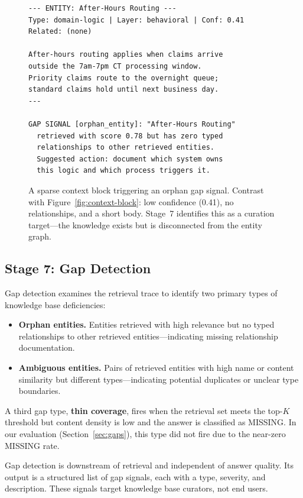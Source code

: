 \documentclass[11pt,a4paper]{article}
\begin{document}
\begin{figure}[t]
\begin{lstlisting}
--- ENTITY: After-Hours Routing ---
Type: domain-logic | Layer: behavioral | Conf: 0.41
Related: (none)

After-hours routing applies when claims arrive
outside the 7am-7pm CT processing window.
Priority claims route to the overnight queue;
standard claims hold until next business day.
---

GAP SIGNAL [orphan_entity]: "After-Hours Routing"
  retrieved with score 0.78 but has zero typed
  relationships to other retrieved entities.
  Suggested action: document which system owns
  this logic and which process triggers it.
\end{lstlisting}
\caption{A sparse context block triggering an orphan gap signal. Contrast with Figure~\ref{fig:context-block}: low confidence (0.41), no relationships, and a short body. Stage~7 identifies this as a curation target---the knowledge exists but is disconnected from the entity graph.}
\label{fig:gap-example}
\end{figure}

\subsection{Stage 7: Gap Detection}

Gap detection examines the retrieval trace to identify two primary types of knowledge base deficiencies:

\begin{itemize}[nosep]
  \item \textbf{Orphan entities.} Entities retrieved with high relevance but no typed relationships to other retrieved entities---indicating missing relationship documentation.
  \item \textbf{Ambiguous entities.} Pairs of retrieved entities with high name or content similarity but different types---indicating potential duplicates or unclear type boundaries.
\end{itemize}

A third gap type, \textbf{thin coverage}, fires when the retrieval set meets the top-$K$ threshold but content density is low and the answer is classified as MISSING. In our evaluation (Section~\ref{sec:gaps}), this type did not fire due to the near-zero MISSING rate.

Gap detection is downstream of retrieval and independent of answer quality. Its output is a structured list of gap signals, each with a type, severity, and description. These signals target knowledge base curators, not end users.
\end{document}
